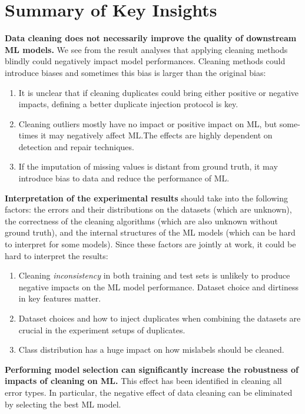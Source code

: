 \section{Summary of Key Insights} \label{sec:summary-of-key-insights}

\textbf{Data cleaning does not necessarily improve the quality of downstream ML models.} We see from the result analyses that
applying cleaning methods blindly could negatively impact model performances. 
Cleaning methods could introduce biases and sometimes this bias is larger than the original bias:

\begin{enumerate}
	\item {
		It is unclear that if cleaning duplicates could bring either positive or negative impacts,
		defining a better duplicate injection protocol is key.
	}
	\item {
		Cleaning outliers mostly have no impact or positive impact on ML, but some-
		times it may negatively affect ML.The effects are highly dependent
		on detection and repair techniques.	
	} 
	\item {
		If the imputation of missing values is distant from ground truth, it may introduce bias to data
		and reduce the performance of ML.
	}
\end{enumerate}

\textbf{Interpretation of the experimental results} should take into the following factors: the errors and their distributions on the datasets (which are unknown), the correctness of the cleaning algorithms (which are also unknown without ground truth), and the internal structures of the ML models (which can be hard to interpret for some models). Since these factors are jointly at work, it could be hard to interpret the results:

\begin{enumerate}
	\item {
		Cleaning \textit{inconsistency} in both training and test sets is unlikely to produce negative impacts on the ML model performance. Dataset choice and dirtiness in key features matter.
	}
	\item {
		Dataset choices and how to inject duplicates when combining the datasets are crucial in the experiment setups of duplicates.
	}
	\item {
		Class distribution has a huge impact on how mislabels
		should be cleaned.
	} 
\end{enumerate}

\textbf{Performing model selection can significantly increase the robustness of impacts of cleaning on ML.} This effect has been identified in cleaning all error types. In particular, the negative effect of
data cleaning can be eliminated by selecting the best ML model.

